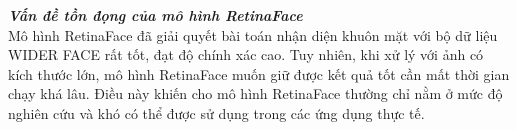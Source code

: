 {    \noindent
    \textbf{\textit{Vấn đề tồn đọng của mô hình RetinaFace}} \\
    Mô hình RetinaFace đã giải quyết bài toán nhận diện khuôn mặt với bộ dữ liệu WIDER FACE rất tốt, đạt độ chính xác cao.
    Tuy nhiên, khi xử lý với ảnh có kích thước lớn, mô hình RetinaFace muốn giữ được kết quả tốt cần mất thời gian chạy khá lâu.
    Điều này khiến cho mô hình RetinaFace thường chỉ nằm ở mức độ nghiên cứu và khó có thể được sử dụng trong các ứng dụng thực tế.
}